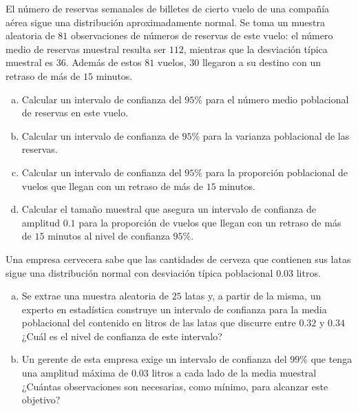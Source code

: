 \documentclass[12pt]{article}\usepackage[]{graphicx}\usepackage[]{color}
\begin{document}
\begin{prob}
El número de reservas semanales de billetes de cierto vuelo de una compañía aérea sigue una
distribución aproximadamente normal. Se toma un muestra aleatoria de $81$ observaciones de
números de reservas de este vuelo: el número medio de reservas muestral resulta ser $112$,
mientras que la desviación típica muestral es  $36$. Además de estos $81$ vuelos, $30$
llegaron a su destino con un retraso de más de $15$ minutos.
\begin{enumerate}[a)]
\item Calcular un intervalo de confianza del $95\%$ para el número medio
poblacional de reservas en este vuelo.
\item Calcular un intervalo de confianza de $95\%$ para la varianza
poblacional de las reservas.
\item Calcular un intervalo de confianza del $95\%$ para la proporción
poblacional de vuelos que llegan con un retraso de más de $15$ minutos.
\item Calcular el tamaño muestral que asegura un intervalo de
confianza de amplitud $0.1$ para la proporción de vuelos que llegan
con un retraso de más de $15$ minutos al nivel de confianza $95\%$.
\end{enumerate}
\end{prob}

\begin{prob}
Una empresa cervecera sabe que las cantidades de cerveza que contienen
sus latas sigue una distribución normal con desviación típica poblacional $0.03$ litros.
\begin{enumerate}[a)]
\item Se extrae una muestra aleatoria de $25$ latas y, a partir de la
misma, un experto en estadística construye un  intervalo de confianza
para la media poblacional del contenido en litros de las latas que
discurre entre $0.32$ y $0.34$ ¿Cuál es el nivel de confianza de este
intervalo?
\item Un gerente de esta empresa exige un intervalo de confianza del
$99\%$  que tenga una amplitud máxima de $0.03$ litros a cada lado de la
media  muestral ¿Cuántas observaciones son necesarias, como mínimo,
para alcanzar este objetivo?
\end{enumerate}
\end{prob}
\newpage
\end{document}
